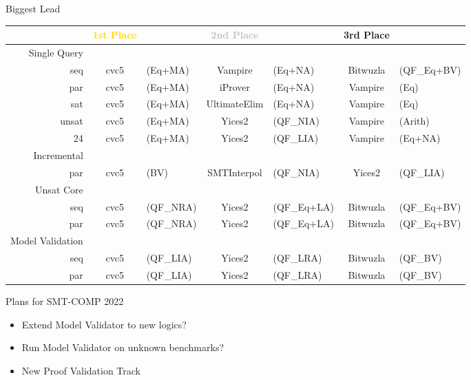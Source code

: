 \documentclass[table]{beamer}
\def\emph#1{\textcolor{MYblue}{#1}}
\begin{document}
\begin{frame}{Biggest Lead}
  \begin{tabular}{r|c@{}lc@{}lc@{}l}
    &\textcolor{gold}{\textbf{1st Place}} &&
    \textcolor{silver}{\textbf{2nd Place}} &&
    \textcolor{bronze}{\textbf{3rd Place}}\\
    \hline
    \emph{Single Query}\\
    seq & cvc5&{\tiny(Eq+MA)} & Vampire&{\tiny(Eq+NA)} & Bitwuzla&{\tiny(QF\_Eq+BV)} \\
    par & cvc5&{\tiny(Eq+MA)} & iProver&{\tiny(Eq+NA)} & Vampire&{\tiny(Eq)} \\
    sat & cvc5&{\tiny(Eq+MA)} & UltimateElim&{\tiny(Eq+NA)} & Vampire&{\tiny(Eq)}\\
    unsat & cvc5&{\tiny(Eq+MA)} & Yices2&{\tiny(QF\_NIA)} & Vampire&{\tiny(Arith)}\\
    24 &  cvc5&{\tiny(Eq+MA)} & Yices2&{\tiny(QF\_LIA)} & Vampire&{\tiny(Eq+NA)}\\[3pt]
    \pause
    \emph{Incremental}\\
    par & cvc5&{\tiny(BV)} &SMTInterpol&{\tiny(QF\_NIA)}
    &Yices2&{\tiny(QF\_LIA)}\\[3pt]
    \pause
    \emph{Unsat Core}\\
    seq & cvc5&{\tiny(QF\_NRA)} &
    Yices2&{\tiny(QF\_Eq+LA)} &
    Bitwuzla&{\tiny(QF\_Eq+BV)} \\
    par & cvc5&{\tiny(QF\_NRA)} &
    Yices2&{\tiny(QF\_Eq+LA)} &
    Bitwuzla&{\tiny(QF\_Eq+BV)} \\[3pt]
    \pause
    \emph{Model Validation}\\
    seq &  cvc5&{\tiny(QF\_LIA)} & Yices2&{\tiny(QF\_LRA)}
        & Bitwuzla&{\tiny(QF\_BV)} \\
    par &  cvc5&{\tiny(QF\_LIA)} & Yices2&{\tiny(QF\_LRA)}
        & Bitwuzla&{\tiny(QF\_BV)} \\
  \end{tabular}
\end{frame}

\begin{frame}{Plans for SMT-COMP 2022}
  \begin{itemize}
  \item Extend Model Validator to \emph{new logics}?

  \item Run Model Validator on \emph{unknown} benchmarks?
  \item New \emph{Proof Validation} Track
  \end{itemize}
  
\end{frame}
\end{document}
